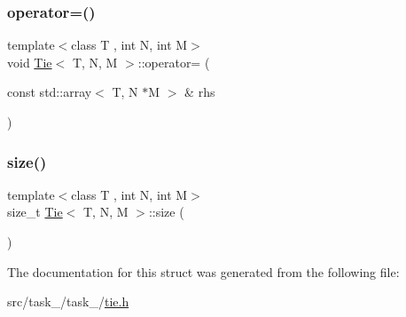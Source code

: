 \subsubsection{\texorpdfstring{operator=()}{operator=()}}
{\footnotesize\ttfamily template$<$class T , int N, int M$>$ \\
void \hyperlink{structTie}{Tie}$<$ T, N, M $>$\+::operator= (\begin{DoxyParamCaption}\item[{const std\+::array$<$ T, N $\ast$M $>$ \&}]{rhs }\end{DoxyParamCaption})\hspace{0.3cm}{\ttfamily [inline]}}

\mbox{\label{structTie_adcd725ffba3501b45266c52b863795af}} 
\subsubsection{\texorpdfstring{size()}{size()}}
{\footnotesize\ttfamily template$<$class T , int N, int M$>$ \\
size\+\_\+t \hyperlink{structTie}{Tie}$<$ T, N, M $>$\+::size (\begin{DoxyParamCaption}{ }\end{DoxyParamCaption})\hspace{0.3cm}{\ttfamily [inline]}}



The documentation for this struct was generated from the following file\+:\begin{DoxyCompactItemize}
\item 
src/task\+\_/task\+\_/\hyperlink{tie_8h}{tie.\+h}\end{DoxyCompactItemize}
